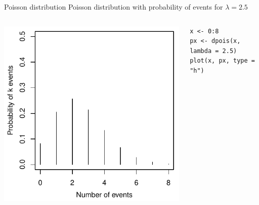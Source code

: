 \documentclass[aspectratio=169]{beamer}
\begin{document}
\begin{frame}[fragile]{Poisson distribution}
  Poisson distribution with probability of events for $\lambda = 2.5$\\[2ex]

\begin{columns}[c]
\begin{column}{.6\textwidth}
  \begin{center}
    \includegraphics[scale=.7]{../figures/pois_dist}
  \end{center}
\end{column}
\begin{column}{.4\textwidth}
  \begin{lstlisting}
x <- 0:8
px <- dpois(x, lambda = 2.5)
plot(x, px, type = "h")
\end{lstlisting}
\end{column}
\end{columns}
\end{frame}
\end{document}
